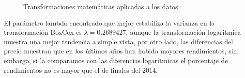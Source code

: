 \begin{figure}[!h]
	\centering
	\qquad
	\qquad
	\qquad
	\caption{Transformaciones matemáticas aplicadas a los datos}
	\label{fig20}
\end{figure}

El parámetro lambda encontrado que mejor estabiliza la varianza en la transformación BoxCox es $\lambda = 0.2689427$, aunque la transformación logaritmica muestra una mejor tendencia a simple vista, por otro lado, las diferencias del precio muestran que en los últimos años han habido mayores rendimientos, sin embargo, si la comparamos con las diferencias logarítmicas el porcentaje de rendimientos no es mayor que el de finales del 2014. 

